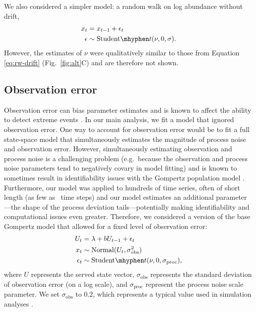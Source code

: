\documentclass[12pt]{article}
\begin{document}
We also considered a simpler model: a random walk on log abundance without drift,
\begin{align}
x_t &= x_{t-1} + \epsilon_t\\
\epsilon &\sim \mathrm{Student}\mhyphen t(\nu, 0, \sigma).
\end{align}
However, the estimates of $\nu$ were qualitatively similar to those from
Equation \ref{eq:rw-drift} (Fig.~\ref{fig:alt}C) and are therefore not shown.

\subsection{Observation error} Observation error can bias parameter
estimates \cite{knape2012} and is known to affect the ability to detect extreme
events \cite{ward2007}. In our main analysis, we fit a model that ignored
observation error. One way to account for observation error would be to fit a
full state-space model that simultaneously estimates the magnitude of process
noise and observation error. However, simultaneously estimating observation and
process noise is a challenging problem (e.g.\ because the observation and
process noise parameters tend to negatively covary in model fitting) and is
known to sometimes result in identifiability issues with the Gompertz
population model \cite{knape2008}. Furthermore, our model was applied to
hundreds of time series, often of short length (as few as \minTimeSteps\ time
steps) and our model estimates an additional parameter---the shape of the
process deviation tails---potentially making identifiability and computational
issues even greater. Therefore, we considered a version of the base Gompertz
model that allowed for a fixed level of observation error:
\begin{align}
U_t &= \lambda + b U_{t-1} + \epsilon_t\\
x_t &\sim \mathrm{Normal}(U_t, \sigma_\mathrm{obs}^2)\\
\epsilon_t &\sim \mathrm{Student}\mhyphen t(\nu, 0, \sigma_\mathrm{proc}),
\end{align}
where \(U\) represents the served state vector, \(\sigma_\mathrm{obs}\)
represents the standard deviation of observation error (on a log scale), and
\(\sigma_\mathrm{proc}\) represent the process noise scale parameter. We set
\(\sigma_\mathrm{obs}\) to \(0.2\), which represents a typical value used in
simulation analyses \cite{valpine2002, thorson2014b}.
\end{document}
